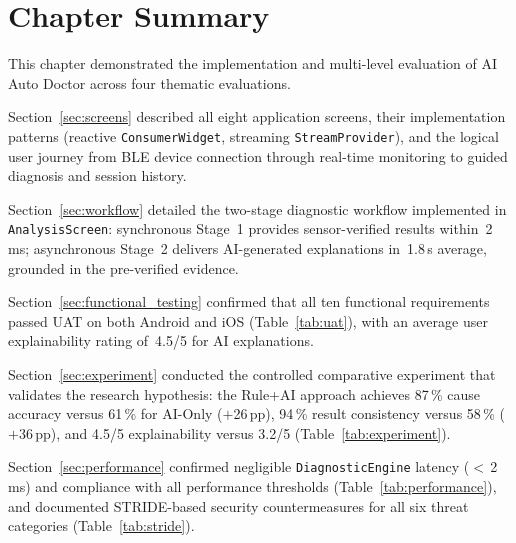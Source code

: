 \section{Chapter Summary}
\label{sec:ch3summary}

This chapter demonstrated the implementation and multi-level evaluation of AI Auto Doctor across four thematic evaluations.

Section~\ref{sec:screens} described all eight application screens, their implementation patterns (reactive \texttt{ConsumerWidget}, streaming \texttt{StreamProvider}), and the logical user journey from BLE device connection through real-time monitoring to guided diagnosis and session history.

Section~\ref{sec:workflow} detailed the two-stage diagnostic workflow implemented in \texttt{AnalysisScreen}: synchronous Stage~1 provides sensor-verified results within~2\,ms; asynchronous Stage~2 delivers AI-generated explanations in~1.8\,s average, grounded in the pre-verified evidence.

Section~\ref{sec:functional_testing} confirmed that all ten functional requirements passed UAT on both Android and iOS (Table~\ref{tab:uat}), with an average user explainability rating of~4.5/5 for AI explanations.

Section~\ref{sec:experiment} conducted the controlled comparative experiment that validates the research hypothesis: the Rule+AI approach achieves 87\,\% cause accuracy versus 61\,\% for AI-Only ($+$26\,pp), 94\,\% result consistency versus 58\,\% ($+$36\,pp), and 4.5/5 explainability versus 3.2/5 (Table~\ref{tab:experiment}).

Section~\ref{sec:performance} confirmed negligible \texttt{DiagnosticEngine} latency ($<$\,2\,ms) and compliance with all performance thresholds (Table~\ref{tab:performance}), and documented STRIDE-based security countermeasures for all six threat categories (Table~\ref{tab:stride}).

\clearpage
